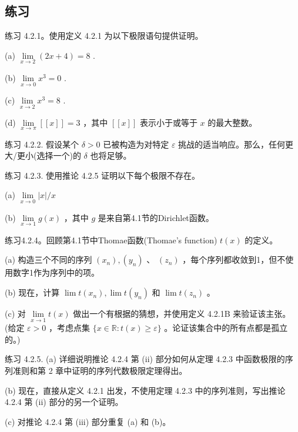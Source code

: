 \subsection{练习}

练习 4.2.1。使用定义 4.2.1 为以下极限语句提供证明。

(a) \(\mathop{\lim }\limits_{{x \rightarrow  2}}\left( {{2x} + 4}\right)  = 8\) .

(b) \(\mathop{\lim }\limits_{{x \rightarrow  0}}{x}^{3} = 0\) .

(c) \(\mathop{\lim }\limits_{{x \rightarrow  2}}{x}^{3} = 8\) .

(d) \(\mathop{\lim }\limits_{{x \rightarrow  \pi }}\left\lbrack  \left\lbrack  x\right\rbrack  \right\rbrack   = 3\) ，其中 \(\left\lbrack  \left\lbrack  x\right\rbrack  \right\rbrack\) 表示小于或等于 \(x\) 的最大整数。

练习 4.2.2. 假设某个 \(\delta  > 0\) 已被构造为对特定 \(\varepsilon\) 挑战的适当响应。那么，任何更大/更小(选择一个)的 \(\delta\) 也将足够。

练习 4.2.3. 使用推论 4.2.5 证明以下每个极限不存在。

(a) \(\mathop{\lim }\limits_{{x \rightarrow  0}}\left| x\right| /x\)

(b) \(\mathop{\lim }\limits_{{x \rightarrow  1}}g\left( x\right)\) ，其中 \(g\) 是来自第4.1节的Dirichlet函数。

练习4.2.4。回顾第4.1节中Thomae函数(Thomae’s function) \(t\left( x\right)\) 的定义。

(a) 构造三个不同的序列 \(\left( {x}_{n}\right) ,\left( {y}_{n}\right)\) 、 \(\left( {z}_{n}\right)\) ，每个序列都收敛到1，但不使用数字1作为序列中的项。

(b) 现在，计算 \(\lim t\left( {x}_{n}\right) ,\lim t\left( {y}_{n}\right)\) 和 \(\lim t\left( {z}_{n}\right)\) 。

(c) 对 \(\mathop{\lim }\limits_{{x \rightarrow  1}}t\left( x\right)\) 做出一个有根据的猜想，并使用定义 4.2.1B 来验证该主张。(给定 \(\varepsilon  > 0\) ，考虑点集 \(\{ x \in  \mathbb{R} : t\left( x\right)  \geq  \varepsilon \}\) 。论证该集合中的所有点都是孤立的。)

练习 4.2.5. (a) 详细说明推论 4.2.4 第 (ii) 部分如何从定理 4.2.3 中函数极限的序列准则和第 2 章中证明的序列代数极限定理得出。

(b) 现在，直接从定义 4.2.1 出发，不使用定理 4.2.3 中的序列准则，写出推论 4.2.4 第 (ii) 部分的另一个证明。

(c) 对推论 4.2.4 第 (iii) 部分重复 (a) 和 (b)。

